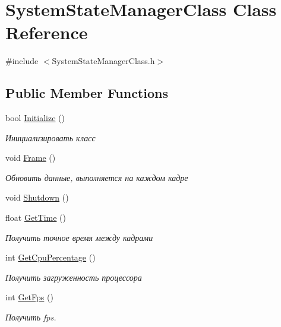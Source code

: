\hypertarget{class_system_state_manager_class}{}\section{System\+State\+Manager\+Class Class Reference}
\label{class_system_state_manager_class}


{\ttfamily \#include $<$System\+State\+Manager\+Class.\+h$>$}

\subsection*{Public Member Functions}
\begin{DoxyCompactItemize}
\item 
bool \hyperlink{class_system_state_manager_class_aba060cf68a7240e41a8d8d4370acf28a}{Initialize} ()
\begin{DoxyCompactList}\small\item\em Инициализировать класс \end{DoxyCompactList}\item 
void \hyperlink{class_system_state_manager_class_a9f20907fb689668c4f828b6b87be7b37}{Frame} ()
\begin{DoxyCompactList}\small\item\em Обновить данные, выполняется на каждом кадре \end{DoxyCompactList}\item 
void \hyperlink{class_system_state_manager_class_a41f390159f5f7e5e3c37c979442a6faf}{Shutdown} ()
\item 
float \hyperlink{class_system_state_manager_class_a3aaa7d15e2a88c31dce17811cd88762e}{Get\+Time} ()
\begin{DoxyCompactList}\small\item\em Получить точное время между кадрами \end{DoxyCompactList}\item 
int \hyperlink{class_system_state_manager_class_a7a79d6eaabb2778652531ca2a8292e88}{Get\+Cpu\+Percentage} ()
\begin{DoxyCompactList}\small\item\em Получить загруженность процессора \end{DoxyCompactList}\item 
int \hyperlink{class_system_state_manager_class_aef966c133ee68cee9d15cc5853a6aa2b}{Get\+Fps} ()
\begin{DoxyCompactList}\small\item\em Получить fps. \end{DoxyCompactList}\end{DoxyCompactItemize}
